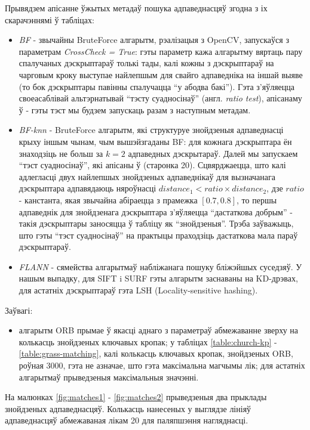 Прывядзем апісанне ўжытых метадаў пошука адпаведнасцяў згодна з іх скарачэннямі ў табліцах:
\begin{itemize}
  \item \textit{BF} - звычайны BruteForce алгарытм, рэалізацыя з OpenCV, запускаўся з параметрам \textit{CrossCheck = True}:
  гэты параметр кажа алгарытму вяртаць пару спалучаных дэскрыптараў толькі тады, калі кожны з дэскрыптараў на чарговым кроку
  выступае найлепшым для свайго адпаведніка на іншай выяве (то бок дэскрыптары павінны спалучацца ``у абодва бакі''). Гэта з'яўляецца
  своеасаблівай альтэрнатывай ``тэсту суадносінаў'' (англ. \textit{ratio test}),
  апісанаму ў \cite{sift-paper} - гэты тэст мы будзем запускаць разам з наступным метадам.
  \item \textit{BF-knn} - BruteForce алгарытм, які структуруе знойдзеныя адпаведнасці крыху іншым чынам, чым вышэйзгаданы BF:
  для кожнага дэскрыптара ён знаходзіць не больш за $k=2$ адпаведных дэскрытараў. Далей мы запускаем ``тэст суадносінаў'',
  які апісаны ў \cite{sift-paper} (старонка 20). Сцвярджаецца, што калі адлегласці двух найлепшых знойдзеных адпаведнікаў для
  вызначанага дэскрыптара адпавядаюць няроўнасці $distance_1 < ratio \times distance_2$, дзе $ratio$ - канстанта, якая звычайна
  абіраецца з прамежка $[0.7, 0.8]$, то першы адпаведнік для знойдзенага дэскрыптара з'яўляецца ``дастаткова добрым'' - такія дэскрыптары
  заносяцца ў табліцу як ``знойдзеныя''. Трэба заўважыць, што гэты ``тэст суадносінаў'' на практыцы праходзіць дастаткова мала
  параў дэскрыптараў.
  \item \textit{FLANN} - сямейства алгарытмаў набліжанага пошуку бліжэйшых суседзяў. У нашым выпадку, для SIFT i SURF гэты алгарытм
  заснаваны на KD-дрэвах, для астатніх дэскрыптараў гэта LSH (Locality-sensitive hashing).
\end{itemize}

Заўвагі:
\begin{itemize}
  \item алгарытм ORB прымае ў якасці аднаго з параметраў абмежаванне зверху на колькасць знойдзеных ключавых кропак;
  у табліцах \ref{table:church-kp} - \ref{table:grass-matching}, калі колькасць ключавых кропак, знойдзеных ORB, роўная 3000,
  гэта не азначае, што гэта максімальна магчымы лік; для астатніх алгарытмаў прыведзеныя максімальныя значэнні.
\end{itemize}

На малюнках \ref{fig:matches1} - \ref{fig:matches2} прыведзеныя два прыклады знойдзеных адпаведнасцяў. Колькасць нанесеных
у выглядзе лініяў адпаведнасцяў абмежаваная лікам 20 для паляпшэння нагляднасці.

